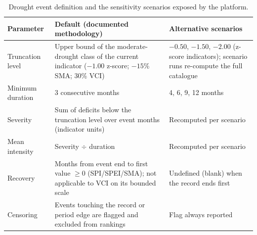 \documentclass[10pt,a4paper]{article}
\begin{document}
\begin{table}[t]
\caption{Drought event definition and the sensitivity scenarios exposed by the platform.}
\label{tab:events}
\small
\begin{tabularx}{\textwidth}{@{}p{}p{}X@{}}
\toprule
Parameter & Default (documented methodology) & Alternative scenarios \\
\midrule
Truncation level & Upper bound of the moderate-drought class of the current indicator ($-1.00$ z-score; $-15$\% SMA; 30\% VCI) & $-0.50$, $-1.50$, $-2.00$ (z-score indicators); scenario runs re-compute the full catalogue \\
Minimum duration & 3 consecutive months & 4, 6, 9, 12 months \\
Severity & Sum of deficits below the truncation level over event months (indicator units) & Recomputed per scenario \\
Mean intensity & Severity $\div$ duration & Recomputed per scenario \\
Recovery & Months from event end to first value $\ge 0$ (SPI/SPEI/SMA); not applicable to VCI on its bounded scale & Undefined (blank) when the record ends first \\
Censoring & Events touching the record or period edge are flagged and excluded from rankings & Flag always reported \\
\bottomrule
\end{tabularx}
\end{table}
\end{document}
